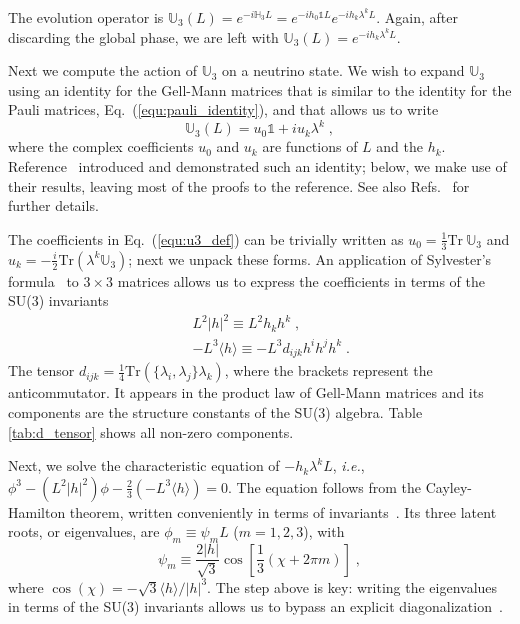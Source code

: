 \documentclass[final,5p,times,twocolumn]{elsarticle}
\newcommand{\ie}{{\it i.e.}}
\newcommand{\eq}{Eq.}
\newcommand{\Refs}{Refs.}
\newcommand{\equ}[1]{\eq~(\ref{equ:#1})}
\begin{document}
The evolution operator is $\mathbb{U}_3\left(L\right) = e^{-i \mathbb{H}_3 L} = e^{-ih_0\mathbb{1}L}e^{-ih_k\lambda^kL}$.   Again, after discarding the global phase, we are left with $\mathbb{U}_3\left(L\right) = e^{-ih_k\lambda^kL}$.  

Next we compute the action of $\mathbb{U}_3$ on a neutrino state.  We wish to expand $\mathbb{U}_3$ using an identity for the Gell-Mann matrices that is similar to the identity for the Pauli matrices, \equ{pauli_identity}, and that allows us to write
\begin{equation}
 \label{equ:u3_def}
 \mathbb{U}_3\left(L\right) 
 = 
 u_0 \mathbb{1} + i u_k \lambda^k \;,
\end{equation}
where the complex coefficients $u_0$ and $u_k$ are functions of $L$ and the $h_k$.  Reference\ \cite{MacFarlane:1968vc} introduced and demonstrated such an identity; below, we make use of their results, leaving most of the proofs to the reference.  See also \Refs\ \cite{Lehrer-Ilamed:1964, Rosen:1971nt, Torruella:1975, Kusnezov:1995, Curtright:2015iba, VanKortryk:2015kua} for further details.

The coefficients in \equ{u3_def} can be trivially written as $u_0=\frac{1}{3}\text{Tr}~\mathbb{U}_3$ and $u_k=-\frac{i}{2}\text{Tr}(\lambda^k \mathbb{U}_3)$; next we unpack these forms.  An application of Sylvester's formula\ \cite{Sylvester:1883} to $3 \times 3$ matrices allows us to express the coefficients in terms of the SU(3) invariants
\begin{eqnarray*}
 \label{equ:def_I2}
 && L^2 \left\vert h \right\vert^2  \equiv L^2 h_kh^k \;, \\
 \label{equ:def_I3}
 && -L^3 \langle h \rangle \equiv -L^3 d_{ijk}h^ih^jh^k \;.
\end{eqnarray*}
The tensor $d_{ijk} = \frac{1}{4} \text{Tr} \left( \lbrace\lambda_i,\lambda_j\rbrace\lambda_k \right)$, where the brackets represent the anticommutator.  It appears in the product law of Gell-Mann matrices and its components are the structure constants of the SU(3) algebra.  Table \ref{tab:d_tensor} shows all non-zero components.

Next, we solve the characteristic equation of $-h_k\lambda^kL$, \ie, $\phi^3-(L^2 \left\vert h \right\vert^2) \phi-\frac{2}{3} (-L^3 \langle h \rangle)=0$.  The equation follows from the Cayley-Hamilton theorem, written conveniently in terms of invariants\ \cite{MacFarlane:1968vc, Curtright:2015iba}.  Its three latent roots, or eigenvalues, are $\phi_m \equiv \psi_m L$ ($m=1,2,3$), with
\begin{equation}
 \label{equ:phi_alpha}
 \psi_m
 \equiv
 \frac{2 \left\vert h \right\vert}{\sqrt{3}} \cos\left[\frac{1}{3}\left(\chi+2\pi m \right)\right] \;,
\end{equation}
where $\cos\left(\chi\right) = -\sqrt{3} \langle h \rangle / \lvert h \rvert^3$.  The step above is key: writing the eigenvalues in terms of the SU(3) invariants allows us to bypass an explicit diagonalization\ \cite{Curtright:2015iba}.
\end{document}
